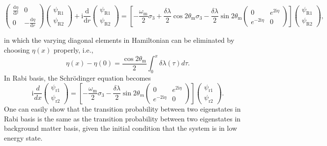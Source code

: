 \documentclass[%
reprint,
 amsmath,amssymb,
 prd,
]{revtex4-1}
\newcommand{\ri}{\mathrm{i}}
\begin{document}
\begin{widetext}
\begin{equation*}
    \begin{pmatrix}  \frac{\mathrm d\eta}{\mathrm dr}  & 0 \\ 0 & - \frac{\mathrm d\eta}{\mathrm d r}  \end{pmatrix} \begin{pmatrix} \psi_{\mathrm R1} \\ \psi_{\mathrm R2} \end{pmatrix} + \mathrm i \frac{\mathrm d}{\mathrm dr} \begin{pmatrix} \psi_{\mathrm R1} \\ \psi_{\mathrm R2} \end{pmatrix} 
    = \left[ -\frac{\omega_{\mathrm m} }{2} \sigma_3  + \frac{\delta \lambda}{2} \cos 2\theta_{\mathrm m}  \sigma_3  - \frac{\delta \lambda}{2} \sin 2\theta_{\mathrm m} \begin{pmatrix} 0 & e^{2\mathrm i\eta} \\ e^{-2 \mathrm i\eta } & 0 \end{pmatrix}   \right] \begin{pmatrix} \psi_{\mathrm R1} \\ \psi_{\mathrm R2} \end{pmatrix},
\end{equation*}
\end{widetext}
in which the varying diagonal elements in Hamiltonian can be eliminated by choosing $\eta(x)$ properly, i.e.,
\begin{equation}
    \eta(x) - \eta(0) =  \frac{\cos 2\theta_{\mathrm{m}}}{2} \int_0^x \delta\lambda (\tau) d\tau.
\end{equation}
In Rabi basis, the Schr\"{o}dinger equation becomes
\begin{equation*}
    \ri \frac{d}{dx} \begin{pmatrix} \psi_{\mathrm r1} \\ \psi_{\mathrm r2} \end{pmatrix} = \left[ - \frac{\omega_{\mathrm m}}{2} \sigma_3 - \frac{\delta \lambda}{2} \sin 2\theta_m \begin{pmatrix} 0 & e^{2\ri\eta} \\ e^{-2 \ri \eta } & 0 \end{pmatrix}\right] \begin{pmatrix} \psi_{\mathrm r1} \\ \psi_{\mathrm r2} \end{pmatrix}.
\end{equation*}
One can easily show that the transition probability between two eigenstates in Rabi basis is the same as the transition probability between two eigenstates in background matter basis, given the initial condition that the system is in low energy state.
\end{document}
